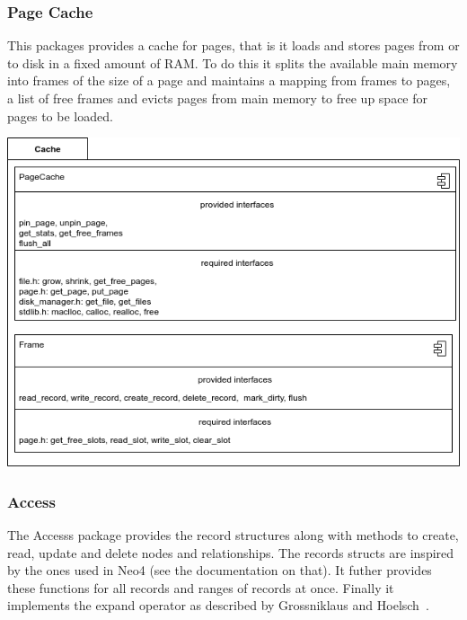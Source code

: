     \subsubsection{Page Cache}
        This packages provides a cache for pages, that is it loads and stores pages from or to disk in a fixed amount of RAM. To do this it splits the available main memory into frames of the size of a page and maintains a mapping from frames to pages, a list of free frames and evicts pages from main memory to free up space for pages to be loaded.
        \begin{center}
         \includegraphics[keepaspectratio, width=\textwidth, height=0.4\textheight]{img/cache_arch.png} \\
        \end{center}
        \newpage
        
    \subsubsection{Access}
        The Accesss package provides the record structures along with methods to create, read, update and delete nodes and relationships. The records structs are inspired by the ones used in Neo4 (see the documentation on that).  It futher provides these functions for all records and ranges of records at once. Finally it implements the expand operator as described by Grossniklaus and Hoelsch~\autocite{Holsch2016Algeb}.

